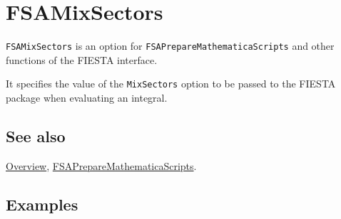 \documentclass[../FeynHelpersManual.tex]{subfiles}
\begin{document}
\begin{Shaded}
\begin{Highlighting}[]
 
\end{Highlighting}
\end{Shaded}

\hypertarget{fsamixsectors}{
\section{FSAMixSectors}\label{fsamixsectors}}

\texttt{FSAMixSectors} is an option for
\texttt{FSAPrepareMathematicaScripts} and other functions of the FIESTA
interface.

It specifies the value of the \texttt{MixSectors} option to be passed to
the FIESTA package when evaluating an integral.

\subsection{See also}

\hyperlink{toc}{Overview},
\hyperlink{fsapreparemathematicascripts}{FSAPrepareMathematicaScripts}.

\subsection{Examples}
\end{document}
